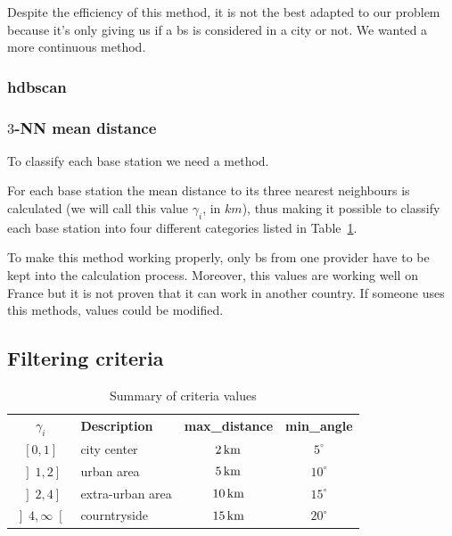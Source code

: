 \documentclass[lettersize,journal,english]{IEEEtran}
\begin{document}
Despite the efficiency of this method, it is not the best adapted to our problem because it's only giving us if a \acrshort{bs} is considered in a city or not.
We wanted a more continuous method.

\subsubsection{\acrshort{hdbscan}}

\subsubsection{$3$-NN mean distance}
To classify each base station we need a method.

For each base station the mean distance to its three nearest neighbours is calculated (we will call this value $\gamma_i$, in $\unit{km}$), thus making it possible to classify each base station into four different categories listed in Table~\ref{crit_summary}.

To make this method working properly, only \acrshort{bs} from one provider have to be kept into the calculation process.
Moreover, this values are working well on France but it is not proven that it can work in another country. If someone uses this methods, values could be modified.

\subsection{Filtering criteria}

\begin{table}[!b]
    \centering
    \caption{Summary of criteria values}
    \label{crit_summary}
    \begin{tabular}{clcc}
        \toprule
        \textbf{$\gamma_i$} & \textbf{Description} & \textbf{max\_distance} & \textbf{min\_angle} \\
        \cmidrule(lr){1-4}
        $\left[0, 1\right]$ & city center & $\unit[2]{km}$ & $5^\circ$ \\
        $\left]1, 2\right]$ & urban area & $\unit[5]{km}$ & $10^\circ$ \\
        $\left]2, 4\right]$ & extra-urban area & $\unit[10]{km}$ & $15^\circ$ \\
        $\left]4, \infty\right[$ & courntryside & $\unit[15]{km}$ & $20^\circ$ \\
        \bottomrule
    \end{tabular}
\end{table}
\end{document}
